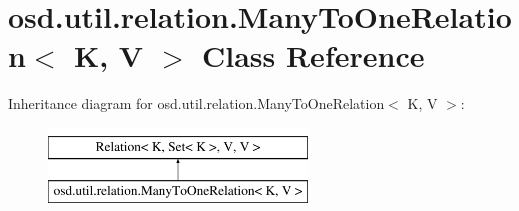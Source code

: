\hypertarget{classosd_1_1util_1_1relation_1_1_many_to_one_relation_3_01_k_00_01_v_01_4}{\section{osd.\-util.\-relation.\-Many\-To\-One\-Relation$<$ K, V $>$ Class Reference}
\label{classosd_1_1util_1_1relation_1_1_many_to_one_relation_3_01_k_00_01_v_01_4}
}
Inheritance diagram for osd.\-util.\-relation.\-Many\-To\-One\-Relation$<$ K, V $>$\-:\begin{figure}[H]
\begin{center}
\leavevmode
\includegraphics[height=2.000000cm]{classosd_1_1util_1_1relation_1_1_many_to_one_relation_3_01_k_00_01_v_01_4}
\end{center}
\end{figure}
